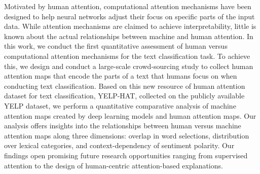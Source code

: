 Motivated by human attention, computational attention mechanisms have been designed to help neural networks adjust their focus on specific parts of the input data. While attention mechanisms are claimed to achieve interpretability, little is known about the actual relationships between machine and human attention. In this work, we conduct the first quantitative assessment of human versus computational attention mechanisms for the text classification task. To achieve this, we design and conduct a large-scale crowd-sourcing study to collect human attention maps that encode the parts of a text that humans focus on when conducting text classification. Based on this new resource of human attention dataset for text classification, YELP-HAT, collected on the publicly available YELP dataset, we perform a quantitative comparative analysis of machine attention maps created by deep learning models and human attention maps. Our analysis offers insights into the relationships between human versus machine attention maps along three dimensions: overlap in word selections, distribution over lexical categories, and context-dependency of sentiment polarity. Our findings open promising future research opportunities ranging from supervised attention to the design of human-centric attention-based explanations.
